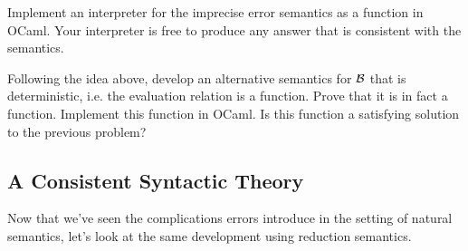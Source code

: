 \begin{exercise}
Implement an interpreter for the imprecise error semantics as a
function in OCaml.  Your interpreter is free to produce any answer
that is consistent with the semantics.
\end{exercise}

\begin{exercise}\label{ex:determ}
Following the idea above, develop an alternative semantics for
$\mathcal{B}$ that is deterministic, i.e.  the evaluation relation is a
function.  Prove that it is in fact a function.  Implement this
function in OCaml.  Is this function a satisfying solution to the
previous problem?
\end{exercise}


\subsection{A Consistent Syntactic Theory}

Now that we've seen the complications errors introduce in the setting
of natural semantics, let's look at the same development using
reduction semantics.

